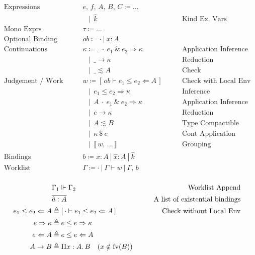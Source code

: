 \documentclass{article}
\newcommand{\sep}{~|~}
\newcommand{\nsep}{& \,~~~|~~}
\newcommand{\newsyntax}[2]{\text{#1} \qquad & #2 \coloneqq}
\newcommand{\comm}[1]{& \qquad \text{#1}}
\newcommand{\inferapp}[4][\kappa]{#2 ~\cdot~#3~\&~#4 \Rightarrow #1}
\newcommand{\acheck}[3]{#1 \le #2 \Leftarrow #3}
\newcommand{\scheck}[2]{#1 \Leftarrow #2}
\newcommand{\ainfer}[3][\kappa]{#2 \le #3 \Rightarrow #1}
\newcommand{\sinfer}[2][\kappa]{#2 \Rightarrow #1}
\newcommand{\reduce}[2][\kappa]{#2 \longrightarrow #1}
\newcommand{\compact}[2]{#1 \lesssim #2}
\newcommand{\capp}[2][\kappa]{#1 ~\$~ #2}
\newcommand{\kvar}{\hat{k}}
\newcommand{\aPi}[3][x]{\Pi #1 : #2.\, #3}
\newcommand{\wlgroup}[1]{\llbracket\, #1 \,\rrbracket}
\newcommand{\exb}[2][a]{\hat{#1} : #2}
\begin{document}
\begin{align*}
    \newsyntax{Expressions}{e,\, f ,\, A,\, B,\, C} \dots \\
                          \nsep \kvar \comm{Kind Ex. Vars}\\
    \newsyntax{Mono Exprs}{\tau} \dots \\
    \newsyntax{Optional Binding}{ob} \cdot \sep x : A \\
    \newsyntax{Continuations}{\kappa} \inferapp{\_}{e_1}{e_2} \comm{Application Inference} \\
                          \nsep \reduce{\_} \comm{Reduction} \\
                          \nsep \compact{\_}{A} \comm{Check} \\
    \newsyntax{Judgement / Work}{w} [\,ob \vdash \acheck{e_1}{e_2}{A}\,] \comm{Check with Local Env} \\
                          \nsep \ainfer{e_1}{e_2} \comm{Inference} \\
                          \nsep \inferapp{A}{e_1}{e_2} \comm{Application Inference} \\
                          \nsep \reduce{e} \comm{Reduction} \\
                          \nsep \compact{A}{B} \comm{Type Compactible} \\
                          \nsep \capp{e} \comm{Cont Application} \\
                          \nsep \wlgroup{w ,\, \dots} \comm{Grouping} \\
    \newsyntax{Bindings}{b} x:A \sep \hat{x} : A \sep \kvar \\
    \newsyntax{Worklist}{\Gamma} \cdot \sep \Gamma \vdash w \sep \Gamma ,\, b \\
\end{align*}

\begin{align*}
    & \Gamma_1 \Vdash \Gamma_2  \comm{\text{Worklist Append}} \\
    & \overline{\exb{A}} \comm{A list of existential bindings} \\
    \acheck{e_1}{e_2}{A}  & \triangleq [\,\cdot \vdash \acheck{e_1}{e_2}{A}\,] \comm{Check without Local Env} \\
    \sinfer{e} & \triangleq \ainfer{e}{e} \\
    \scheck{e}{A} & \triangleq \acheck{e}{e}{A} \\
    A \rightarrow B & \triangleq \aPi{A}{B} \quad (x \notin \mathrm{fv}(B)) \\
\end{align*}
\end{document}
